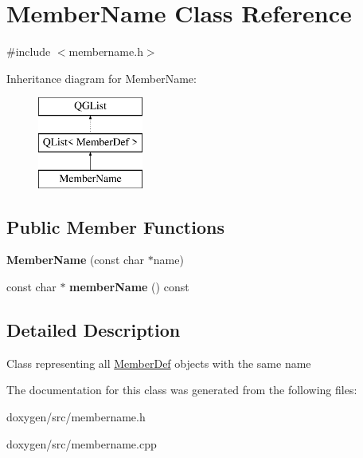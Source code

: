 \hypertarget{class_member_name}{}\section{Member\+Name Class Reference}
\label{class_member_name}


{\ttfamily \#include $<$membername.\+h$>$}

Inheritance diagram for Member\+Name\+:\begin{figure}[H]
\begin{center}
\leavevmode
\includegraphics[height=3.000000cm]{class_member_name}
\end{center}
\end{figure}
\subsection*{Public Member Functions}
\begin{DoxyCompactItemize}
\item 
\mbox{\label{class_member_name_a0ed888cfec53a6b4192665263faec32b}} 
{\bfseries Member\+Name} (const char $\ast$name)
\item 
\mbox{\label{class_member_name_abf757759a80315511dd58c8bd5e7890c}} 
const char $\ast$ {\bfseries member\+Name} () const
\end{DoxyCompactItemize}


\subsection{Detailed Description}
Class representing all \mbox{\hyperlink{class_member_def}{Member\+Def}} objects with the same name 

The documentation for this class was generated from the following files\+:\begin{DoxyCompactItemize}
\item 
doxygen/src/membername.\+h\item 
doxygen/src/membername.\+cpp\end{DoxyCompactItemize}
